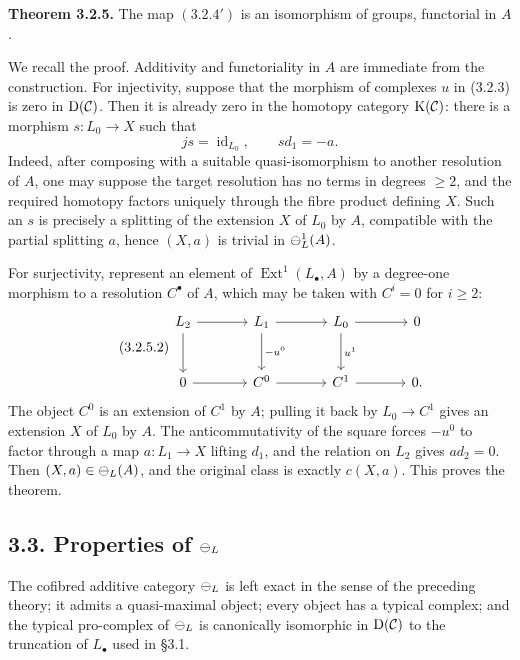 \documentclass[11pt]{article}
\providecommand{\Ext}{\operatorname{Ext}}
\providecommand{\id}{\operatorname{id}}
\begin{document}
\textbf{Theorem 3.2.5.}  The map \((3.2.4')\) is an isomorphism of groups, functorial in \(A\).

We recall the proof.  Additivity and functoriality in \(A\) are immediate from the construction.  For injectivity, suppose that the morphism of complexes \(u\) in (3.2.3) is zero in \(\mathrm D(\mathcal C)\).  Then it is already zero in the homotopy category \(\mathrm K(\mathcal C)\): there is a morphism \(s:L_0\to X\) such that
\begin{equation}\tag{3.2.5.1}
  js=\id_{L_0},\qquad s d_1=-a.
\end{equation}
Indeed, after composing with a suitable quasi-isomorphism to another resolution of \(A\), one may suppose the target resolution has no terms in degrees \(\geq2\), and the required homotopy factors uniquely through the fibre product defining \(X\).  Such an \(s\) is precisely a splitting of the extension \(X\) of \(L_0\) by \(A\), compatible with the partial splitting \(a\), hence \((X,a)\) is trivial in \(\mathcal\Psi^1_L(A)\).

For surjectivity, represent an element of \(\Ext^1(L_\bullet,A)\) by a degree-one morphism to a resolution \(C^\bullet\) of \(A\), which may be taken with \(C^i=0\) for \(i\geq2\):
\begin{equation}\tag{3.2.5.2}
\begin{tikzcd}[column sep=large,row sep=large]
L_2\arrow[r]\arrow[d]&L_1\arrow[r]\arrow[d,"-u^0"]&L_0\arrow[d,"u^1"]\arrow[r]&0\\
0\arrow[r]&C^0\arrow[r]&C^1\arrow[r]&0 .
\end{tikzcd}
\end{equation}
The object \(C^0\) is an extension of \(C^1\) by \(A\); pulling it back by \(L_0\to C^1\) gives an extension \(X\) of \(L_0\) by \(A\).  The anticommutativity of the square forces \(-u^0\) to factor through a map \(a:L_1\to X\) lifting \(d_1\), and the relation on \(L_2\) gives \(a d_2=0\).  Then \((X,a)\in\mathcal\Psi_L(A)\), and the original class is exactly \(c(X,a)\).  This proves the theorem.

\subsection*{3.3. Properties of \(\mathcal\Psi_L\)}
The cofibred additive category \(\mathcal\Psi_L\) is left exact in the sense of the preceding theory; it admits a quasi-maximal object; every object has a typical complex; and the typical pro-complex of \(\mathcal\Psi_L\) is canonically isomorphic in \(\mathrm D(\mathcal C)\) to the truncation of \(L_\bullet\) used in \S3.1.
\end{document}
